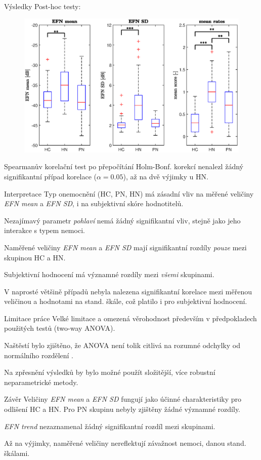 \documentclass{beamer}
\begin{document}
  \begin{frame}{Výsledky}
  	Post-hoc testy:
  	\begin{figure}
  		\centering
  		\includegraphics[width=0.7\linewidth]{boxplot.eps}
  	\end{figure}
  Spearmanův korelační test po přepočítání Holm-Bonf. korekcí nenalezl žádný signifikantní případ korelace ($ \alpha=0.05 $), až na dvě výjimky u HN. 	
  \end{frame}

  \begin{frame}{Interpretace}
  Typ onemocnění (HC, PN, HN) má zásadní vliv na měřené veličiny \emph{EFN mean} a \emph{EFN SD}, i na subjektivní skóre hodnotitelů.
  
  Nezajímavý parametr \emph{pohlaví} nemá žádný signifikantní vliv, stejně jako jeho interakce s typem nemoci.
  
  Naměřené veličiny \emph{EFN mean} a \emph{EFN SD} mají signifikantní rozdíly \emph{pouze} mezi skupinou HC a HN.
  
  Subjektivní hodnocení má významné rozdíly mezi \emph{všemi} skupinami.
  
  V naprosté většině případů nebyla nalezena signifikantní korelace mezi měřenou veličinou a hodnotami na stand. škále, což platilo i pro subjektivní hodnocení.
  \end{frame}

  \begin{frame}{Limitace práce}
  	Velké limitace a omezená věrohodnost především v předpokladech použitých testů (two-way ANOVA).
  	
  	Naštěstí bylo zjištěno, že ANOVA není tolik citlivá na rozumné odchylky od normálního rozdělení \cite{normalita}.
  	
  	Na zpřesnění výsledků by bylo možné použít složitější, více robustní neparametrické metody. 
  \end{frame}

  \begin{frame}{Závěr}
  	Veličiny \emph{EFN mean} a \emph{EFN SD} fungují jako účinné charakteristiky pro odlišení HC a HN. Pro PN skupinu nebyly zjištěny žádné významné rozdíly.
  	
  	\emph{EFN trend} nezaznamenal žádný signifikantní rozdíl mezi skupinami.
  	
  	Až na výjimky, naměřené veličiny nereflektují závažnost nemoci, danou stand. škálami.
  \end{frame}
\end{document}
